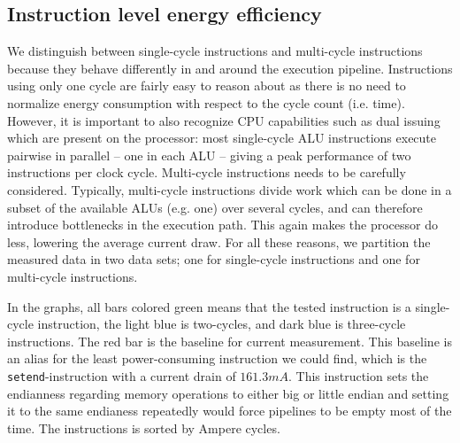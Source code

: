 
\subsection{Instruction level energy efficiency}

We distinguish between single-cycle instructions and multi-cycle instructions
because they behave differently in and around the execution pipeline.
Instructions using only one cycle are fairly easy to reason about as there is no
need to normalize energy consumption with respect to the cycle count (i.e.
time). However, it is important to also recognize CPU capabilities such as dual
issuing which are present on the processor: most single-cycle ALU instructions
execute pairwise in parallel -- one in each ALU -- giving a peak performance of
two instructions per clock cycle. Multi-cycle instructions needs to be carefully
considered. Typically, multi-cycle instructions divide work which can be done in
a subset of the available ALUs (e.g. one) over several cycles, and can therefore
introduce bottlenecks in the execution path. This again makes the processor do
less, lowering the average current draw. For all these reasons, we partition the
measured data in two data sets; one for single-cycle instructions and one for
multi-cycle instructions.

In the graphs, all bars colored green means that the tested instruction is a
single-cycle instruction, the light blue is two-cycles, and dark blue is
three-cycle instructions. The red bar is the baseline for current measurement.
This baseline is an alias for the least power-consuming instruction we could
find, which is the \texttt{setend}-instruction with a current drain of
$161.3mA$. This instruction sets the endianness regarding memory operations to
either big or little endian \cite{armcompilerref} and setting it to the same
endianess repeatedly would force pipelines to be empty most of the time. The
instructions is sorted by Ampere cycles.

